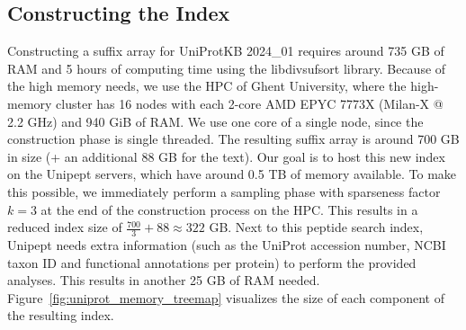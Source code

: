\documentclass[11pt]{article}
\newenvironment{Figure}
{\par\medskip\noindent\minipage{\linewidth}}
{\endminipage\par\medskip}
\begin{document}
\begin{multicols}{2}
        \subsection{Constructing the Index}
        Constructing a suffix array for UniProtKB 2024\_01 requires around 735 GB of RAM and 5 hours of computing time using the libdivsufsort library.
        Because of the high memory needs, we use the HPC of Ghent University, where the high-memory cluster has 16 nodes with each 2-core AMD EPYC 7773X (Milan-X @ 2.2 GHz) and 940 GiB of RAM\@.
        We use one core of a single node, since the construction phase is single threaded.
        The resulting suffix array is around 700 GB in size (+ an additional 88 GB for the text).
        Our goal is to host this new index on the Unipept servers, which have around 0.5 TB of memory available.
        To make this possible, we immediately perform a sampling phase with sparseness factor $k = 3$ at the end of the construction process on the HPC\@.
        This results in a reduced index size of $\frac{700}{3} + 88 \approx 322$ GB\@.
        Next to this peptide search index, Unipept needs extra information (such as the UniProt accession number, NCBI taxon ID and functional annotations per protein) to perform the provided analyses.
        This results in another 25 GB of RAM needed.
        Figure~\ref{fig:uniprot_memory_treemap} visualizes the size of each component of the resulting index.

        \begin{Figure}
            \centering
            \label{fig:uniprot_memory_treemap}
        \end{Figure}


\end{multicols}
\end{document}
